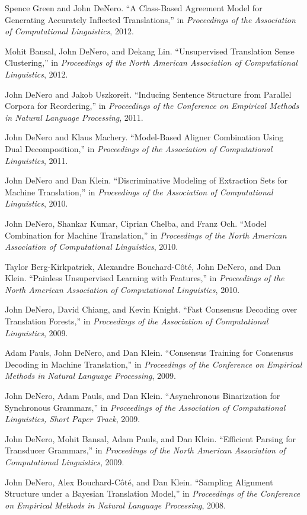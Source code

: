 \documentclass[margin,line]{res}
\begin{document}
\begin{resume}
Spence Green and John DeNero. ``A Class-Based Agreement Model for Generating Accurately Inflected Translations,'' in {\it Proceedings of the Association of Computational Linguistics}, 2012.

Mohit Bansal, John DeNero, and Dekang Lin. ``Unsupervised Translation Sense Clustering,'' in {\it Proceedings of the North American Association of Computational Linguistics}, 2012.

John DeNero and Jakob Uszkoreit.  ``Inducing Sentence Structure from Parallel Corpora for Reordering,'' in {\it Proceedings of the Conference on Empirical Methods in Natural Language Processing}, 2011.

John DeNero and Klaus Machery. ``Model-Based Aligner Combination Using Dual Decomposition,'' in {\it Proceedings of the Association of Computational Linguistics}, 2011.

John DeNero and Dan Klein. ``Discriminative Modeling of Extraction Sets for Machine Translation,'' in {\it Proceedings of the Association of Computational Linguistics}, 2010.

John DeNero, Shankar Kumar, Ciprian Chelba, and Franz Och. ``Model Combination for Machine Translation,'' in {\it Proceedings of the North American Association of Computational Linguistics}, 2010.

Taylor Berg-Kirkpatrick, Alexandre Bouchard-Côté, John DeNero, and Dan Klein. ``Painless Unsupervised Learning with Features,'' in {\it Proceedings of the North American Association of Computational Linguistics}, 2010.

John DeNero, David Chiang, and Kevin Knight. ``Fast Consensus Decoding over Translation Forests,'' in {\it Proceedings of the Association of Computational Linguistics}, 2009.

Adam Pauls, John DeNero, and Dan Klein. ``Consensus Training for Consensus Decoding in Machine Translation,'' in {\it Proceedings of the Conference on Empirical Methods in Natural Language Processing}, 2009.

John DeNero, Adam Pauls, and Dan Klein. ``Asynchronous Binarization for Synchronous Grammars,'' in {\it Proceedings of the Association of Computational Linguistics, Short Paper Track}, 2009.

John DeNero, Mohit Bansal, Adam Pauls, and Dan Klein. ``Efficient Parsing for Transducer Grammars,'' in {\it Proceedings of the North American Association of Computational Linguistics}, 2009.

John DeNero, Alex Bouchard-Côté, and Dan Klein. ``Sampling Alignment Structure under a Bayesian Translation Model,'' in {\it Proceedings of the Conference on Empirical Methods in Natural Language Processing}, 2008.


\end{resume}
\end{document}
